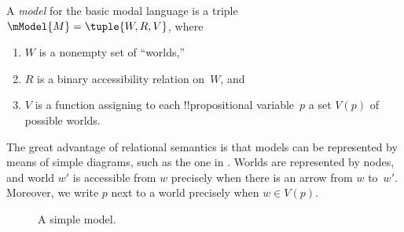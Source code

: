 \documentclass[../../../include/open-logic-section]{subfiles}
\begin{document}


\begin{defn}
  A \emph{model} for the basic modal language is a triple $\mModel{M}
  = \tuple{W, R, V}$, where
  \begin{enumerate}
  \item $W$ is a nonempty set of ``worlds,''
  \item $R$ is a binary accessibility relation on~$W$, and
  \item $V$ is a function assigning to each !!{propositional
    variable}~$p$ a set $V(p)$ of possible worlds.
  \end{enumerate}
\end{defn}

The great advantage of relational semantics is that models can be
represented by means of simple diagrams, such as the one in
. Worlds are represented by nodes, and world
$w'$ is accessible from $w$ precisely when there is an arrow from $w$
to~$w'$. Moreover, we write $p$ next to a world precisely when $w \in
V(p)$. 

\begin{figure}
  \begin{center}
  \end{center}
\caption{A simple model.}
\end{figure}
\end{document}
